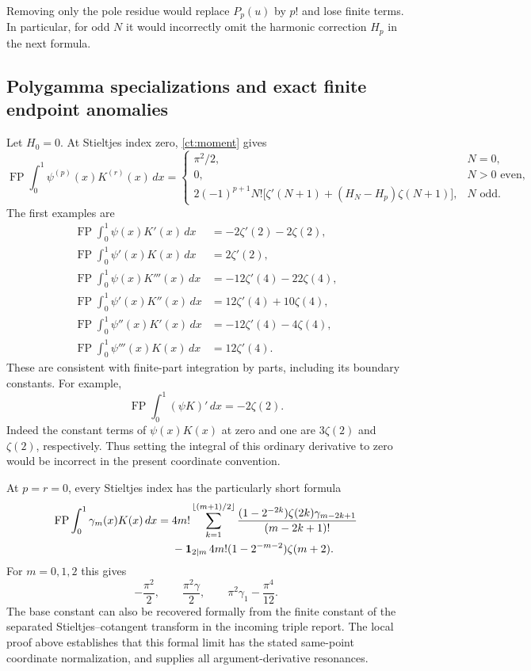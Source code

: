 Removing only the pole residue would replace $P_p(u)$ by $p!$ and
lose finite terms. In particular, for odd $N$ it would incorrectly
omit the harmonic correction $H_p$ in the next formula.

\subsection{Polygamma specializations and exact finite endpoint anomalies}

Let $H_0=0$. At Stieltjes index zero, \eqref{ct:moment} gives
\begin{equation}\label{ct:zero-index}
 \operatorname{FP}\int_0^1\psi^{(p)}(x)K^{(r)}(x)\,dx
 =\begin{cases}
 \pi^2/2,&N=0,\\
 0,&N>0\text{ even},\\
 2(-1)^{p+1}N!\bigl[\zeta'(N+1)
                +(H_N-H_p)\zeta(N+1)\bigr],&N\text{ odd}.
 \end{cases}
\end{equation}
The first examples are
\begin{align*}
 \operatorname{FP}\int_0^1\psi(x)K'(x)\,dx
   &=-2\zeta'(2)-2\zeta(2),\\
 \operatorname{FP}\int_0^1\psi'(x)K(x)\,dx
   &=2\zeta'(2),\\
 \operatorname{FP}\int_0^1\psi(x)K'''(x)\,dx
   &=-12\zeta'(4)-22\zeta(4),\\
 \operatorname{FP}\int_0^1\psi'(x)K''(x)\,dx
   &=12\zeta'(4)+10\zeta(4),\\
 \operatorname{FP}\int_0^1\psi''(x)K'(x)\,dx
   &=-12\zeta'(4)-4\zeta(4),\\
 \operatorname{FP}\int_0^1\psi'''(x)K(x)\,dx
   &=12\zeta'(4).
\end{align*}
These are consistent with finite-part integration by parts, including
its boundary constants. For example,
\[
 \operatorname{FP}\int_0^1(\psi K)'\,dx=-2\zeta(2).
\]
Indeed the constant terms of $\psi(x)K(x)$ at zero and one are
$3\zeta(2)$ and $\zeta(2)$, respectively. Thus setting the integral
of this ordinary derivative to zero would be incorrect in the present
coordinate convention.

At $p=r=0$, every Stieltjes index has the particularly short formula
\begin{align}
 \operatorname{FP}\int_0^1\gamma_m(x)K(x)\,dx
 ={}&4m!\sum_{k=1}^{\lfloor(m+1)/2\rfloor}
   \frac{(1-2^{-2k})\zeta(2k)\gamma_{m-2k+1}}
                       {(m-2k+1)!}\notag\\
 &-\mathbf1_{2\mid m}\,4m!(1-2^{-m-2})\zeta(m+2).
 \label{ct:all-m-base}
\end{align}
For $m=0,1,2$ this gives
\[
 -\frac{\pi^2}{2},\qquad
 \frac{\pi^2\gamma}{2},\qquad
 \pi^2\gamma_1-\frac{\pi^4}{12}.
\]
The base constant can also be recovered formally from the finite
constant of the separated Stieltjes--cotangent transform in the incoming
triple report. The local proof above establishes that this formal limit
has the stated same-point coordinate normalization, and supplies all
argument-derivative resonances.

